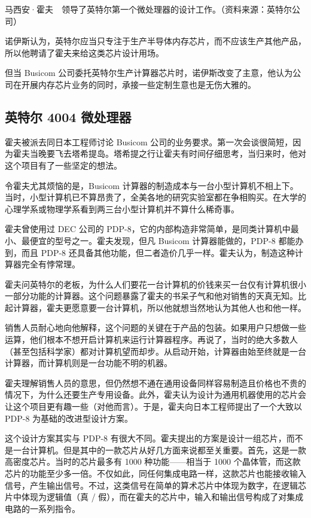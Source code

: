 \documentclass[12pt,UTF8]{ctexbook}
\begin{document}
马西安·霍夫　领导了英特尔第一个微处理器的设计工作。（资料来源：英特尔公司）

诺伊斯认为，英特尔应当只专注于生产半导体内存芯片，而不应该生产其他产品，所以他聘请了霍夫来给这类芯片设计用场。

但当 Busicom 公司委托英特尔生产计算器芯片时，诺伊斯改变了主意，他认为公司在开展内存芯片业务的同时，承接一些定制生意也是无伤大雅的。





\subsection{英特尔 4004 微处理器}


霍夫被派去同日本工程师讨论 Busicom 公司的业务要求。第一次会谈很简短，因为霍夫当晚要飞去塔希提岛。塔希提之行让霍夫有时间仔细思考，当归来时，他对这个项目有了一些坚定的想法。

令霍夫尤其烦恼的是，Busicom 计算器的制造成本与一台小型计算机不相上下。当时，小型计算机已不算昂贵了，全美各地的研究实验室都在争相购买。在大学的心理学系或物理学系看到两三台小型计算机并不算什么稀奇事。

霍夫曾使用过 DEC 公司的 PDP-8，它的内部构造非常简单，是同类计算机中最小、最便宜的型号之一。霍夫发现，但凡 Busicom 计算器能做的，PDP-8 都能办到，而且 PDP-8 还具备其他功能，但二者造价几乎一样。霍夫认为，制造这种计算器完全有悖常理。

霍夫问英特尔的老板，为什么人们要花一台计算机的价钱来买一台仅有计算机很小一部分功能的计算器。这个问题暴露了霍夫的书呆子气和他对销售的天真无知。比起计算器，霍夫更愿意要一台计算机，所以他就想当然地认为其他人也和他一样。

销售人员耐心地向他解释，这个问题的关键在于产品的包装。如果用户只想做一些运算，他们根本不想开启计算机来运行计算器程序。再说了，当时的绝大多数人（甚至包括科学家）都对计算机望而却步。从启动开始，计算器由始至终就是一台计算器，而计算机则是一台功能不明的机器。

霍夫理解销售人员的意思，但仍然想不通在通用设备同样容易制造且价格也不贵的情况下，为什么还要生产专用设备。此外，霍夫认为设计为通用机器使用的芯片会让这个项目更有趣一些（对他而言）。于是，霍夫向日本工程师提出了一个大致以 PDP-8 为基础的改进型设计方案。

这个设计方案其实与 PDP-8 有很大不同。霍夫提出的方案是设计一组芯片，而不是一台计算机。但是其中的一款芯片从好几方面来说都至关重要。首先，这是一款高密度芯片。当时的芯片最多有 1000 种功能——相当于 1000 个晶体管，而这款芯片的功能至少多一倍。不仅如此，同任何集成电路一样，这款芯片也能接收输入信号，产生输出信号。不过，这类信号在简单的算术芯片中体现为数字，在逻辑芯片中体现为逻辑值（真 / 假），而在霍夫的芯片中，输入和输出信号构成了对集成电路的一系列指令。
\end{document}
